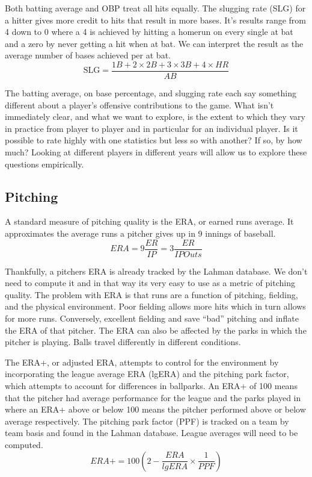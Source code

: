 \documentclass[10pt]{article}
\begin{document}
Both batting average and OBP treat all hits equally.  The slugging rate (SLG) for a hitter gives more credit to hits that result in more bases. It's results range from 4 down to 0 where a 4 is achieved by hitting a homerun on every single at bat and a zero by never getting a hit when at bat. We can interpret the result as the average number of bases achieved per at bat.
\begin{equation}
  \mbox{SLG} = \frac{1B + 2 \times 2B + 3 \times 3B + 4\times HR}{AB}
\end{equation}

The batting average, on base percentage, and slugging rate each say something different about a player's offensive contributions to the game.  What isn't immediately clear, and what we want to explore, is the extent to which they vary in practice from player to player and in particular for an individual player. Is it possible to rate highly with one statistics but less so with another? If so, by how much?  Looking at different players in different years will allow us to explore these questions empirically.

\subsection*{Pitching}

A standard measure of pitching quality is the ERA, or earned runs average. It approximates the average runs a pitcher gives up in 9 innings of baseball.
\begin{equation}
  ERA = 9\frac{ER}{IP} = 3\frac{ER}{IPOuts}
\end{equation}

Thankfully, a pitchers ERA is already tracked by the Lahman database. We don't need to compute it and in that way its very easy to use as a metric of pitching quality. The problem with ERA is that runs are a function of pitching, fielding, and the physical environment.  Poor fielding allows more hits which in turn allows for more runs. Conversely, excellent fielding and save ``bad'' pitching and inflate the ERA of that pitcher.  The ERA can also be affected by the parks in which the pitcher is playing. Balls travel differently in different conditions.

The ERA+, or adjusted ERA, attempts to control for the environment by incorporating the league average ERA (lgERA) and the pitching park factor, which attempts to account for differences in ballparks.  An ERA+ of 100 means that the pitcher had average performance for the league and the parks played in where an ERA+ above or below 100 means the pitcher performed above or below average respectively. The pitching park factor (PPF) is tracked on a team by team basis and found in the Lahman database. League averages will need to be computed.
\begin{equation}
  ERA+ = 100 \left( 2 - \frac{ERA}{lgERA}\times\frac{1}{PPF} \right)
\end{equation}
\end{document}
